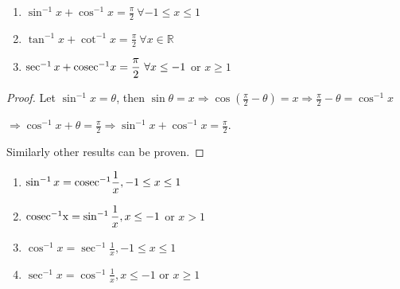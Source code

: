 \begin{theorem}
  \begin{enumerate}
  \item $\sin^{-1}x + \cos^{-1}x = \frac{\pi}{2}~\forall -1\leq x\leq 1$
  \item $\tan^{-1}x + \cot^{-1}x = \frac{\pi}{2}~\forall x\in\mathbb{R}$
  \item $\sec^{-1}x + {\rm cosec}^{-1}x = \frac{\pi}{2}~\forall x\leq -1$ or $x\geq 1$
  \end{enumerate}
\end{theorem}

\begin{proof}
  Let $\sin^{-1}x = \theta$, then $\sin\theta = x \Rightarrow \cos\left(\frac{\pi}{2} - \theta\right) = x \Rightarrow \frac{\pi}{2}
  - \theta = \cos^{-1}x$

  $\Rightarrow \cos^{-1}x + \theta = \frac{\pi}{2} \Rightarrow \sin^{-1}x + \cos^{-1}x = \frac{\pi}{2}$.

  Similarly other results can be proven.
\end{proof}

\begin{theorem}
  \begin{enumerate}
  \item $\sin^{-1}x = {\rm cosec}^{-1}\frac{1}{x}, -1\leq x\leq 1$
  \item ${\rm cosec^{-1}x} = \sin^{-1}\frac{1}{x}, x\leq -1$ or $x > 1$
  \item $\cos^{-1}x = \sec^{-1}\frac{1}{x}, -1\leq x\leq 1$
  \item $\sec^{-1}x = \cos^{-1}\frac{1}{x}, x\leq -1$ or $x\geq 1$
  \end{enumerate}
\end{theorem}
